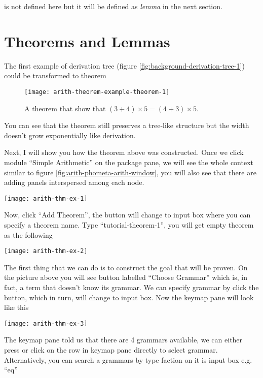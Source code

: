 \documentclass[master.tex]{subfiles}
\begin{document}
 is not defined here but it will be defined as \emph{lemma}
in the next section.

\section{Theorems and Lemmas}
\label{sec:arith-theorems-lemmas}

The first example of derivation tree (figure
\ref{fig:background-derivation-tree-1}) could be transformed to theorem

\begin{figure}[H]
    \centering
\begin{minipage}{0.8\textwidth}
    \texttt{[image: arith-theorem-example-theorem-1]}
\end{minipage}
\caption{A theorem that show that $(3 + 4) \times 5 = (4 + 3) \times 5$.}
\label{fig:arith-theorem-example-theorem-1}
\end{figure}

You can see that the theorem still preserves a tree-like structure but the width
doesn't grow exponentially like derivation.

Next, I will show you how the theorem above was constructed. Once we click
module ``Simple Arithmetic'' on the package pane, we will see the whole
context similar to figure \ref{fig:arith-phometa-arith-window}, you will also
see that there are adding panels interspersed among each node.

\texttt{[image: arith-thm-ex-1]}

Now, click ``Add Theorem'', the button will change to input box where you can
specify a theorem name. Type ``tutorial-theorem-1'', you will get empty theorem
as the following

\texttt{[image: arith-thm-ex-2]}

The first thing that we can do is to construct the goal that will be proven. On
the picture above you will see button labelled ``Choose Grammar'' which is, in
fact, a term that doesn't know its grammar. We can specify grammar by click the
button, which in turn, will change to input box. Now the keymap pane will look
like this

\begin{center}
\texttt{[image: arith-thm-ex-3]}
\end{center}

The keymap pane told us that there are 4 grammars available, we can either press
 or click on the row in keymap pane directly to select
grammar. Alternatively, you can search a grammars by type faction on it is input
box e.g. ``eq''
\end{document}
